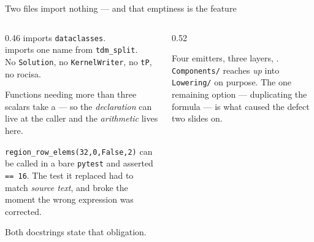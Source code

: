 
\begin{frame}{Two files import nothing --- and that emptiness is the feature}

\begin{columns}[T]
\begin{column}{0.46\textwidth}
\footnotesize
{} imports \texttt{dataclasses}. \\
 imports one name from \texttt{tdm\_split}. \\
No \texttt{Solution}, no \texttt{KernelWriter}, no \texttt{tP}, no rocisa.

\medskip
Functions needing more than three scalars take a  --- so the
\emph{declaration} can live at the caller and the \emph{arithmetic} lives here.

\medskip
{} \texttt{region\_row\_elems(32,0,False,2)} can be called in a bare
\texttt{pytest} and asserted \texttt{== 16}. The test it replaced had to match \emph{source
text}, and broke the moment the wrong expression was corrected.

\medskip
{} Both docstrings state that obligation.
\end{column}

\begin{column}{0.52\textwidth}
\centering
{}

\smallskip
\footnotesize
Four emitters, three layers, . \texttt{Components/} reaches \emph{up} into
\texttt{Lowering/} on purpose. The one remaining option --- duplicating the formula --- is what
caused the defect two slides on.
\end{column}
\end{columns}
\end{frame}
